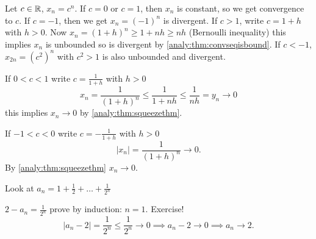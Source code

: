 \documentclass[10pt, a4paper]{article}
\begin{document}
\begin{example}
    Let $c \in \mathbb{R}$, $x_n = c ^ n$.
    If $c = 0$ or $c = 1$,
    then $x_n$ is constant,
    so we get convergence to $c$.
    If $c = -1$,
    then we get $x_n = (-1) ^ n$ is divergent.
    If $c > 1$,
    write $c = 1 + h$ with $h > 0$.
    Now $x_n = (1 + h) ^ n \geq 1 + nh \geq nh$ (Bernoulli inequality)
    this implies $x_n$ is unbounded so is divergent by \autoref{analy:thm:convseqisbound}.
    If $c < -1$,
    $x_{2n} = (c ^ 2) ^ n$ with $c ^ 2 > 1$ is also unbounded and divergent.

    If $0 < c < 1$ write $c = \frac{1}{1 + h}$ with $h > 0$
    \[
    x_n = \frac{1}{(1 + h) ^ n} \leq \frac{1}{1 + nh} \leq \frac{1}{nh} = y_n \rightarrow 0
    \]
    this implies $x_n \rightarrow 0$ by \autoref{analy:thm:squeezethm}.

    If $-1 < c < 0$ write $c = -\frac{1}{1 + h}$ with $h > 0$
    \[
    |x_n| = \frac{1}{(1 + h) ^ n} \rightarrow 0.
    \]
    By \autoref{analy:thm:squeezethm} $x_n \rightarrow 0$.
\end{example}

\begin{example}
    Look at $a_n = 1 + \frac{1}{2} + \dotsc + \frac{1}{2 ^ n}$

    $2 - a_n = \frac{1}{2 ^ n}$ prove by induction: $n = 1$.
    Exercise!
    \[
    |a_n - 2| = \frac{1}{2 ^ n} \leq \frac{1}{2 ^ n} \rightarrow 0 \implies a_n - 2 \rightarrow 0 \implies a_n \rightarrow 2.
    \]
\end{example}
\end{document}
